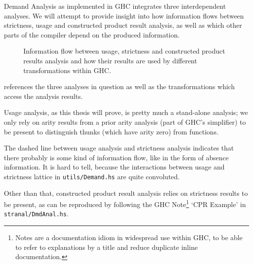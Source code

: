 Demand Analysis as implemented in GHC integrates three interdependent analyses.
We will attempt to provide insight into how information flows between strictness, usage and constructed product result analysis, as well as which other parts of the compiler depend on the produced information.

\begin{figure}[h]
  \centering
  \caption{Information flow between usage, strictness and constructed product results analysis and how their results are used by different transformations within GHC.}
  \label{fig:dmd}
\end{figure}

 references the three analyses in question as well as the transformations which access the analysis results.

Usage analysis, as this thesis will prove, is pretty much a stand-alone analysis; we only rely on arity results from a prior arity analysis (part of GHC's simplifier) to be present to distinguish thunks (which have arity zero) from functions.

The dashed line between usage analysis and strictness analysis indicates that there probably is some kind of information flow, like in the form of absence information. 
It is hard to tell, because the interactions between usage and strictness lattice in \texttt{utils/Demand.hs} are quite convoluted.

Other than that, constructed product result analysis relies on strictness results to be present, as can be reproduced by following the GHC Note\footnote{Notes are a documentation idiom in widespread use within GHC, to be able to refer to explanations by a title and reduce duplicate inline documentation.} `CPR Example' in \texttt{stranal/DmdAnal.hs}.

